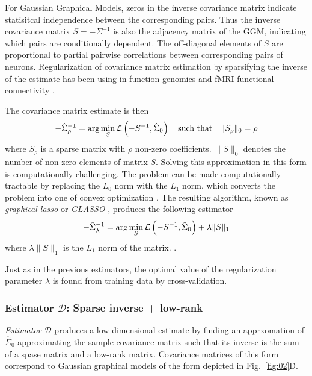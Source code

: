 For Gaussian Graphical Models, zeros in the inverse covariance matrix indicate statisitcal independence between the corresponding pairs. Thus the inverse covariance matrix $S=-\Sigma^{-1}$ is also the adjacency matrix of the GGM, indicating which pairs are conditionally dependent.   The off-diagonal elements of $S$ are proportional to partial pairwise correlations between corresponding pairs of neurons.  Regularization of covariance matrix estimation by sparsifying the inverse of the estimate has been using in function genomics \cite{Schafer:2005,other} and fMRI functional connectivity \cite{Varoquaux:2012}. 

The covariance matrix estimate is then 
\begin{equation}
-\hat\Sigma_\rho^{-1} =\arg\min\limits_S \mathcal L\left(-S^{-1},\hat\Sigma_0\right)  \quad \mbox{such that} \quad  \|S_\rho\|_0 = \rho
\end{equation}
where $S_\rho$ is a sparse matrix with $\rho$ non-zero coefficients. $\|S\|_0$ denotes the number of non-zero elements of matrix $S$.
Solving this approximation in this form is computationally challenging. The problem can be made computationally tractable by replacing the $L_0$ norm with the $L_1$ norm, which converts the problem into one of convex optimization \cite{Donoho:2000}.  The resulting algorithm, known as \emph{graphical lasso} or \emph{GLASSO}  \cite{Meinshausen:2006,Yuan:2007,Banerjee:2008,Friedman:2008}, produces the following estimator  
\begin{equation}
-\hat\Sigma_\lambda^{-1} = \arg\min\limits_S \mathcal L\left(-S^{-1},\hat\Sigma_0\right) + \lambda \|S\|_1
\end{equation}
where $\lambda \|S\|_1$ is the $L_1$ norm of the matrix. .

Just as in the previous estimators, the optimal value of the regularization parameter $\lambda$ is found from training data by cross-validation.

\subsubsection*{Estimator $\mathcal D$: Sparse inverse + low-rank}
\emph{Estimator $\mathcal D$} produces a low-dimensional estimate by finding an apprxomation of $\hat\Sigma_0$ approximating the sample covariance matrix such that its inverse is the sum of a spase matrix and a low-rank matrix. Covariance matrices of this form correspond to Gaussian graphical models of the form depicted in Fig.~\ref{fig:02}D.

